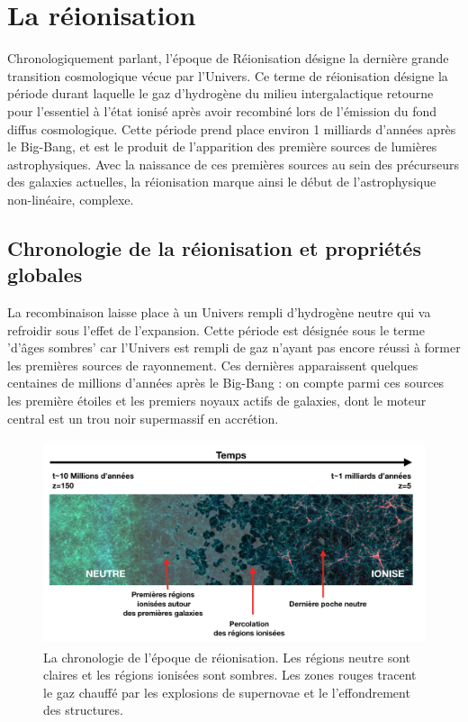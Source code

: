 \chapter{La réionisation}

Chronologiquement parlant, l'époque de Réionisation désigne la dernière grande transition cosmologique vécue par l'Univers. Ce terme de réionisation désigne la période durant laquelle le gaz d'hydrogène du milieu intergalactique retourne pour l'essentiel à l'état ionisé après avoir recombiné lors de l'émission du fond diffus cosmologique. Cette période prend place environ 1 milliards d'années après le Big-Bang, et est le produit de l'apparition des première sources de lumières astrophysiques. Avec la naissance de ces premières sources au sein des précurseurs des galaxies actuelles, la réionisation marque ainsi le début de l'astrophysique non-linéaire, complexe.

\section{Chronologie de la réionisation et propriétés globales}
La recombinaison laisse place à un Univers rempli d'hydrogène neutre qui va refroidir sous l'effet de l'expansion. Cette période est désignée sous le terme 'd'âges sombres' car l'Univers est rempli de gaz n'ayant pas encore réussi à former les premières sources de rayonnement. Ces dernières apparaissent quelques centaines de millions d'années après le Big-Bang : on compte parmi ces sources les première étoiles et les premiers noyaux actifs de galaxies, dont le moteur central est un trou noir supermassif en accrétion.

\begin{figure}[htbp]
	\centering
		\includegraphics[height=6cm]{figs/frisereion.png}
		\caption[Chronologie de la réionisation]{La chronologie de l'époque de réionisation. Les régions neutre sont claires et les régions ionisées sont sombres. Les zones rouges tracent le gaz chauffé par les explosions de supernovae et le l'effondrement des structures.}
	\label{f:frisereion}
\end{figure}

